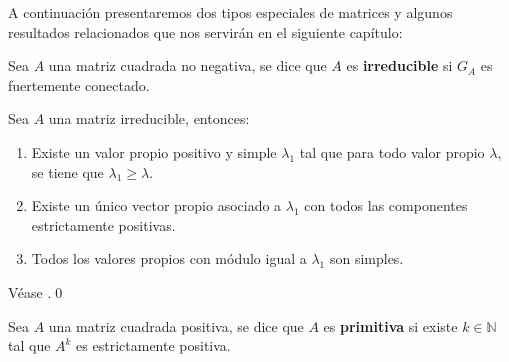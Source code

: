 A continuación presentaremos dos tipos especiales de matrices y algunos resultados relacionados que nos servirán en el siguiente capítulo:
\begin{definition}
Sea $A$ una matriz cuadrada no negativa, se dice que $A$ es \textbf{irreducible} si $G_A$ es fuertemente conectado.
\end{definition}

\begin{theorem} \label{propiedadMatrizIrreducible}
    Sea $A$ una matriz irreducible, entonces:
    \begin{enumerate}
        \item Existe un valor propio positivo y simple  $\lambda_1$ tal que para todo valor propio $\lambda$, se tiene que $\lambda_1\geq\lambda$.
        \item Existe un único vector propio asociado a $\lambda_1$ con todos las componentes estrictamente positivas.
        \item Todos los valores propios con módulo igual a $\lambda_1$ son simples.
    \end{enumerate}
\end{theorem}
\begin{proofs*}
    Véase \cite[Página 263, Teorema 7.13]{Salinelli}.\qed
\end{proofs*}

\begin{definition}
    Sea $A$ una matriz cuadrada positiva, se dice que $A$ es \textbf{primitiva} si existe $k\in\mathbb{N}$ tal que $A^k$ es estrictamente positiva.
\end{definition}

